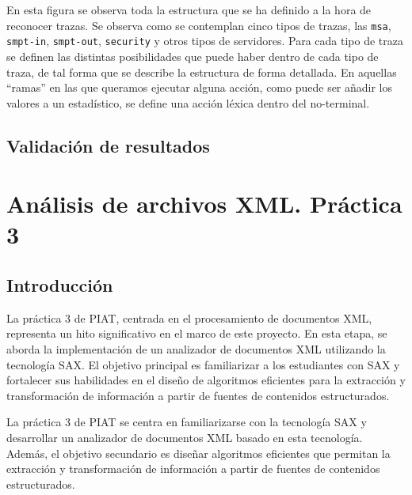 En esta figura se observa toda la estructura que se ha definido a la hora de reconocer trazas. Se observa como se contemplan cinco tipos de trazas, las \lstinline|msa|, \lstinline|smpt-in|, \lstinline|smpt-out|, \lstinline|security| y otros tipos de servidores. Para cada tipo de traza se definen las distintas posibilidades que puede haber dentro de cada tipo de traza, de tal forma que se describe la estructura de forma detallada. En aquellas ``ramas'' en las que queramos ejecutar alguna acción, como puede ser añadir los valores a un estadístico, se define una acción léxica dentro del no-terminal.

\lstset{inputencoding=utf8/latin1}


\subsection{Validación de resultados}

\section{Análisis de archivos XML. Práctica 3}
\subsection{Introducción}

\noindent La práctica 3 de PIAT, centrada en el procesamiento de documentos XML, representa un hito significativo en el marco de este proyecto. En esta etapa, se aborda la implementación de un analizador de documentos XML utilizando la tecnología SAX. El objetivo principal es familiarizar a los estudiantes con SAX y fortalecer sus habilidades en el diseño de algoritmos eficientes para la extracción y transformación de información a partir de fuentes de contenidos estructurados.

La práctica 3 de PIAT se centra en familiarizarse con la tecnología SAX y desarrollar un analizador de documentos XML basado en esta tecnología. Además, el objetivo secundario es diseñar algoritmos eficientes que permitan la extracción y transformación de información a partir de fuentes de contenidos estructurados.


